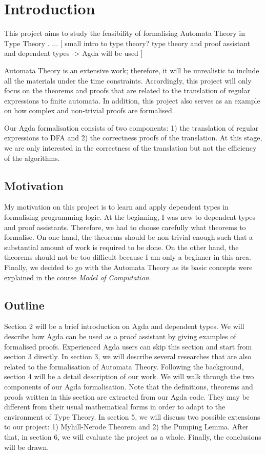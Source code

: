\section{Introduction}
\par This project aims to study the feasibility of formalising
Automata Theory \cite{aho1972} in Type Theory \cite{martin1984}. 
... [ small intro to type theory? type theory and proof assistant and
dependent types -> Agda will be used ] 

\par Automata Theory is an extensive work; therefore, it will be unrealistic to
include all the materials under the time constraints. Accordingly,
this project will only focus on the theorems and
proofs that are related to the translation of regular expressions
to finite automata. In addition, this project also serves as an
example on how complex and non-trivial proofs are formalised. 

\par Our Agda formalisation consists of two components: 1) the
translation of regular expressions to DFA and 2)
the correctness proofs of the translation. At this stage, we are only
interested in the correctness of the translation but not the
efficiency of the algorithms. 


\subsection{Motivation}
\par My motivation on this project is to learn and apply
dependent types in formalising programming logic. At the beginning, I
was new to dependent types and proof assistants. Therefore, we
had to choose carefully what theorems to formalise. On one hand, the theorems
should be non-trivial enough such that a substantial amount of work is required
to be done. On the other hand, the theorems should not be too
difficult because I am only a beginner in this area. Finally, we
decided to go with the Automata Theory as its basic concepts were
explained in the course \textit{Model of Computation}. 


\subsection{Outline}
\par Section 2 will be a brief introduction on Agda and
dependent types. We will describe how Agda can be used as a proof
assistant by giving examples of formalised proofs. Experienced Agda
users can skip this section and start from section 3 directly. In
section 3, we will describe several researches
that are also related to the formalisation of Automata
Theory. Following the background, section 4 will be a detail description of our
work. We will walk through the two components of our Agda
formalisation. Note that the definitions,
theorems and proofs written in this section are extracted from our
Agda code. They may be different from
their usual mathematical forms in order to adapt to the environment of
Type Theory. In section 5, we will discuss two possible extensions
to our project: 1) Myhill-Nerode Theorem and 2) the Pumping
Lemma. After that, in section 6, we will evaluate the project as a
whole. Finally, the conclusions will be drawn. 